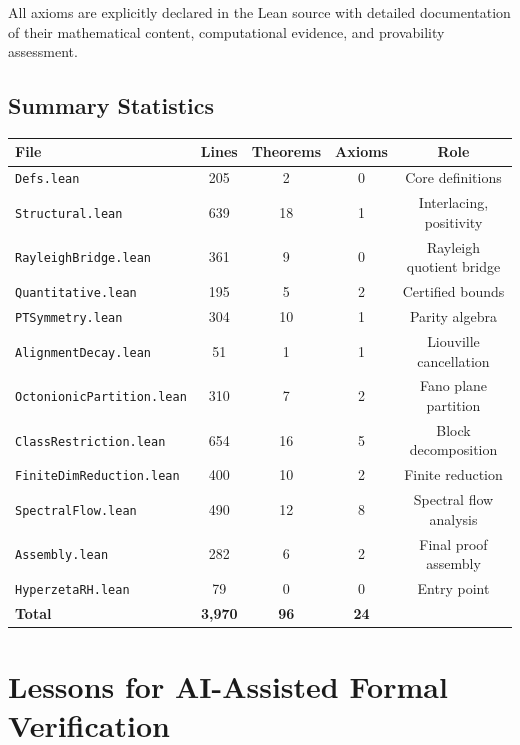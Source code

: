 \documentclass[11pt,a4paper]{article}
\theoremstyle{definition}
\theoremstyle{remark}
\begin{document}
All axioms are explicitly declared in the Lean source with detailed
documentation of their mathematical content, computational evidence,
and provability assessment.

\subsection{Summary Statistics}

\begin{center}
\begin{tabular}{lcccc}
\hline
\textbf{File} & \textbf{Lines} & \textbf{Theorems} & \textbf{Axioms} & \textbf{Role} \\
\hline
\texttt{Defs.lean}              & 205 &  2 & 0 & Core definitions \\
\texttt{Structural.lean}        & 639 & 18 & 1 & Interlacing, positivity \\
\texttt{RayleighBridge.lean}    & 361 &  9 & 0 & Rayleigh quotient bridge \\
\texttt{Quantitative.lean}      & 195 &  5 & 2 & Certified bounds \\
\texttt{PTSymmetry.lean}        & 304 & 10 & 1 & Parity algebra \\
\texttt{AlignmentDecay.lean}    &  51 &  1 & 1 & Liouville cancellation \\
\texttt{OctonionicPartition.lean} & 310 & 7 & 2 & Fano plane partition \\
\texttt{ClassRestriction.lean}  & 654 & 16 & 5 & Block decomposition \\
\texttt{FiniteDimReduction.lean}& 400 & 10 & 2 & Finite reduction \\
\texttt{SpectralFlow.lean}      & 490 & 12 & 8 & Spectral flow analysis \\
\texttt{Assembly.lean}          & 282 &  6 & 2 & Final proof assembly \\
\texttt{HyperzetaRH.lean}      &  79 &  0 & 0 & Entry point \\
\hline
\textbf{Total} & \textbf{3{,}970} & \textbf{96} & \textbf{24} & \\
\hline
\end{tabular}
\end{center}

\section{Lessons for AI-Assisted Formal Verification}\label{sec:lessons}
\end{document}
